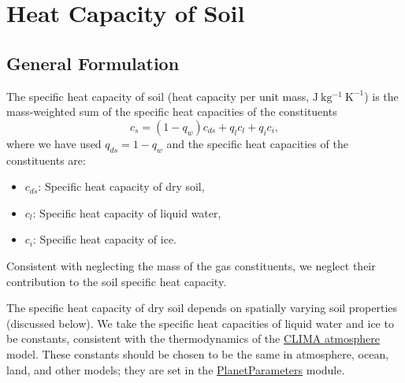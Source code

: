 \documentclass{report}
\begin{document}
\section{Heat Capacity of Soil}

\subsection{General Formulation}

The specific heat capacity of soil (heat capacity per unit mass, $\mathrm{J~kg^{-1}~K^{-1}}$) is the mass-weighted sum of the specific heat capacities of the constituents
\begin{equation}\label{e:soil_specific_heat}
    c_s = (1-q_w) c_{ds} + q_l c_{l} + q_i c_{i},
\end{equation}
where we have used $q_{ds} = 1 - q_w$ and the specific heat capacities of the constituents are:
\begin{itemize}
    \item $c_{ds}$: Specific heat capacity of dry soil,
    \item $c_l$: Specific heat capacity of liquid water,
    \item $c_i$: Specific heat capacity of ice.
\end{itemize}
Consistent with neglecting the mass of the gas constituents, we neglect their contribution to the soil specific heat capacity.

The specific heat capacity of dry soil depends on spatially varying soil properties (discussed below). We take the specific heat capacities of liquid water and ice to be constants, consistent with the thermodynamics of the  \href{https://github.com/climate-machine/Design-Docs/blob/master/CLIMA-atmos/}{CLIMA atmosphere} model. These constants should be chosen to be the same in atmosphere, ocean, land, and other models; they are set in the \href{https://github.com/climate-machine/CLIMA/tree/master/src/Common/PlanetParameters}{PlanetParameters} module.
\end{document}
